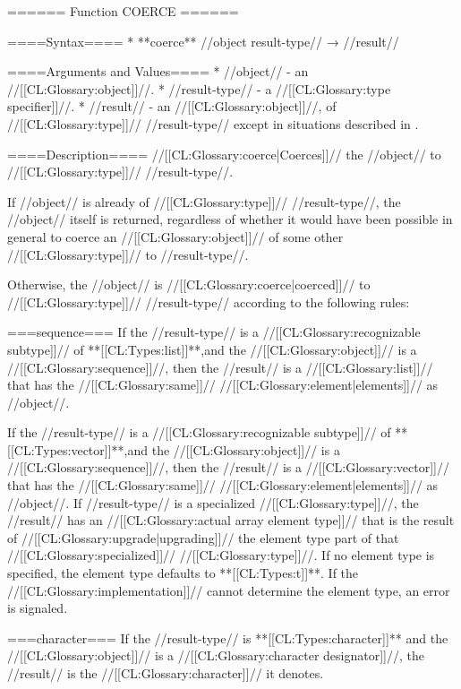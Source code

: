 ====== Function COERCE ======

====Syntax====
  * **coerce** //object result-type// → //result//

====Arguments and Values====
  * //object// - an //[[CL:Glossary:object]]//.
  * //result-type// - a //[[CL:Glossary:type specifier]]//.
  * //result// - an //[[CL:Glossary:object]]//, of //[[CL:Glossary:type]]// //result-type// except in situations described in \secref\RuleOfCanonRepForComplexRationals.

====Description====
//[[CL:Glossary:coerce|Coerces]]// the //object// to //[[CL:Glossary:type]]// //result-type//.

If //object// is already of //[[CL:Glossary:type]]// //result-type//, the //object// itself is returned, regardless of whether it would have been possible in general to coerce an //[[CL:Glossary:object]]// of some other //[[CL:Glossary:type]]// to //result-type//.

Otherwise, the //object// is //[[CL:Glossary:coerce|coerced]]// to //[[CL:Glossary:type]]// //result-type// according to the following rules:

===sequence===
If the //result-type// is a //[[CL:Glossary:recognizable subtype]]// of **[[CL:Types:list]]**,and the //[[CL:Glossary:object]]// is a //[[CL:Glossary:sequence]]//, then the //result// is a //[[CL:Glossary:list]]// that has the //[[CL:Glossary:same]]// //[[CL:Glossary:element|elements]]// as //object//.

If the //result-type// is a //[[CL:Glossary:recognizable subtype]]// of **[[CL:Types:vector]]**,and the //[[CL:Glossary:object]]// is a //[[CL:Glossary:sequence]]//, then the //result// is a //[[CL:Glossary:vector]]// that has the //[[CL:Glossary:same]]// //[[CL:Glossary:element|elements]]// as //object//. If //result-type// is a specialized //[[CL:Glossary:type]]//, the //result// has an //[[CL:Glossary:actual array element type]]// that is the result of //[[CL:Glossary:upgrade|upgrading]]// the element type part of that //[[CL:Glossary:specialized]]// //[[CL:Glossary:type]]//. If no element type is specified, the element type defaults to **[[CL:Types:t]]**. If the //[[CL:Glossary:implementation]]// cannot determine the element type, an error is signaled.

===character===
If the //result-type// is **[[CL:Types:character]]** and the //[[CL:Glossary:object]]// is a //[[CL:Glossary:character designator]]//, the //result// is the //[[CL:Glossary:character]]// it denotes.

